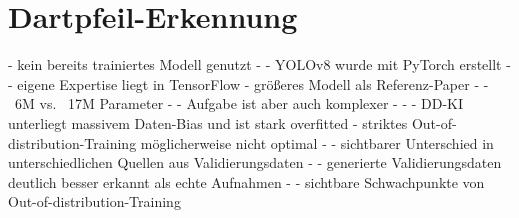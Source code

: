 
\section{Dartpfeil-Erkennung}
\label{sec:diskussion:ki}


- kein bereits trainiertes Modell genutzt
- - YOLOv8 wurde mit PyTorch erstellt
- - eigene Expertise liegt in TensorFlow
- größeres Modell als Referenz-Paper
- - ~6M vs. ~17M Parameter
- - Aufgabe ist aber auch komplexer
- - - DD-KI unterliegt massivem Daten-Bias und ist stark overfitted
- striktes Out-of-distribution-Training möglicherweise nicht optimal
- - sichtbarer Unterschied in unterschiedlichen Quellen aus Validierungsdaten
- - generierte Validierungsdaten deutlich besser erkannt als echte Aufnahmen
- - sichtbare Schwachpunkte von Out-of-distribution-Training

